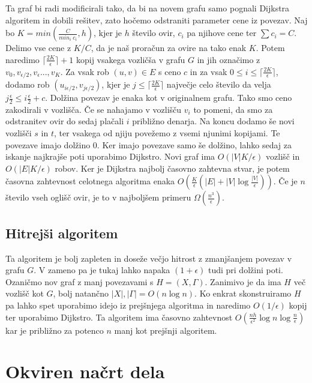 \documentclass{article}
\begin{document}
 Ta graf bi radi modificirali tako, da bi na novem grafu samo pognali Dijkstra algoritem in dobili rešitev, zato hočemo odstraniti parameter cene iz povezav. 
Naj bo  $K = min(\frac{C}{min_i \ c_i}, h)$, kjer je $h$ število ovir, $c_i$ pa njihove cene ter $\sum c_i = C$. Delimo vse cene z $K/C$, da je naš proračun za ovire na tako enak $K$. Potem naredimo $ \lceil{\frac{2K}{\epsilon}}\rceil + 1$  kopij vsakega vozličša v grafu $G$ in jih označimo z $v_0, v_{\epsilon/2}, v_{\epsilon}..., v_K$. Za vsak rob $(u, v) \in E$ s ceno $c$ in za vsak $0 \le i \le \lceil{\frac{2K}{\epsilon}}\rceil $, dodamo rob $(u_{i \epsilon/2}, v_{j \epsilon/2})$, kjer je $j\le\lceil{\frac{2K}{\epsilon}}\rceil$ največje celo število da velja $j\frac{\epsilon}{2}
 \le i \frac{\epsilon}{2} + c$. Dolžina povezav je enaka kot v originalnem grafu. Tako smo ceno zakodirali v vozlišča. Če se nahajamo v vozlišču $v_i$ to pomeni, da smo za odstranitev ovir do sedaj plačali $i$ približno denarja. Na koncu dodamo še novi vozlišči $s$ in $t$, ter vsakega od njiju povežemo z vsemi njunimi kopijami. Te povezave imajo dolžino $0$. Ker imajo povezave samo še dolžino, lahko sedaj za iskanje najkrajše poti uporabimo Dijkstro. Novi graf ima $O(|V|K/\epsilon)$ vozlišč in $O(|E|K/\epsilon)$ robov. Ker je Dijkstra najbolj časovno zahtevna stvar, je potem časovna zahtevnost celotnega algoritma enaka $O(\frac{K}{\epsilon}(|E| + |V|\log\frac{|V|}{\epsilon}) )$. Če je $n$ število vseh oglišč ovir, je to v najboljšem primeru $\Omega(\frac{n^3}{\epsilon})$.

\subsection*{Hitrejši algoritem}

Ta algoritem je bolj zapleten in doseže večjo hitrost z zmanjšanjem povezav v grafu $G$. V zameno pa je tukaj lahko napaka $(1+\epsilon)$ tudi pri dolžini poti. Ozaničmo nov graf z manj povezavami s $H = (X,\Gamma)$. Zanimivo je da ima $H$ več vozlišč kot $G$, bolj natančno $|X|, |\Gamma| = O(n \log n)$. Ko enkrat skonstruiramo $H$ pa lahko spet uporabimo idejo iz prejšnjega algoritma in naredimo $O(1/\epsilon)$ kopij ter uporabimo Dijkstro. Ta algoritem ima časovno zahtevnost $O(\frac{nh}{\epsilon^2}\log n \log \frac{n}{\epsilon})$ kar je približno za potenco $n$ manj kot prejšnji algoritem.


\section*{Okviren načrt dela}
\end{document}
